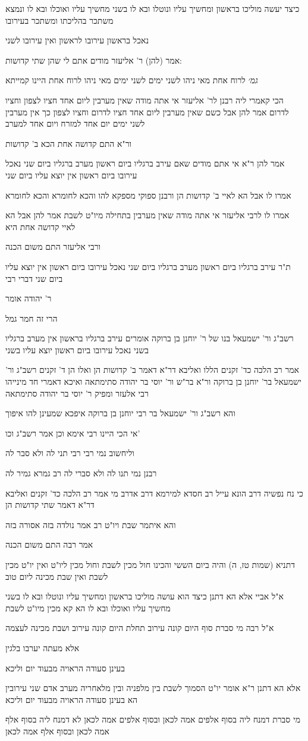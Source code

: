 \documentclass[12pt, openany]{book}
\newcommand{\sethebfont}{
\fontsize{10.5pt}{21.0pt} \selectfont
}
\newcommand{\textblock}[1]{
{\sethebfont #1\\}	
}
\begin{document}
\textblock{כיצד יעשה מוליכו בראשון ומחשיך עליו ונוטלו ובא לו בשני מחשיך עליו ואוכלו ובא לו ונמצא משתכר בהליכתו ומשתכר בעירובו}
\textblock{נאכל בראשון עירובו לראשון ואין עירובו לשני}
\textblock{אמר (להן) ר' אליעזר מודים אתם לי שהן שתי קדושות:}
\textblock{{\large\emph{גמ׳}} לרוח אחת מאי ניהו לשני ימים לשני ימים מאי ניהו לרוח אחת היינו קמייתא}
\textblock{הכי קאמרי ליה רבנן לר' אליעזר אי אתה מודה שאין מערבין ליום אחד חציו לצפון וחציו לדרום אמר להן אבל כשם שאין מערבין ליום אחד חציו לדרום וחציו לצפון כך אין מערבין לשני ימים יום אחד למזרח ויום אחד למערב}
\textblock{ור"א התם קדושה אחת הכא ב' קדושות}
\textblock{אמר להן ר"א אי אתם מודים שאם עירב ברגליו ביום ראשון מערב ברגליו ביום שני נאכל עירובו ביום ראשון אין יוצא עליו ביום שני}
\textblock{אמרו לו אבל הא לאיי ב' קדושות הן ורבנן ספוקי מספקא להו והכא לחומרא והכא לחומרא}
\textblock{אמרו לו לרבי אליעזר אי אתה מודה שאין מערבין בתחילה מיו"ט לשבת אמר להן אבל הא לאיי קדושה אחת היא}
\textblock{ורבי אליעזר התם משום הכנה}
\textblock{ת"ר עירב ברגליו ביום ראשון מערב ברגליו ביום שני נאכל עירובו ביום ראשון אין יוצא עליו ביום שני דברי רבי}
\textblock{ר' יהודה אומר}
\textblock{הרי זה חמר גמל}
\textblock{רשב"ג ור' ישמעאל בנו של ר' יוחנן בן ברוקה אומרים עירב ברגליו בראשון אין מערב ברגליו בשני נאכל עירובו ביום ראשון יוצא עליו בשני}
\textblock{אמר רב הלכה כד' זקנים הללו ואליבא דר"א דאמר ב' קדושות הן ואלו הן ד' זקנים רשב"ג ור' ישמעאל בר' יוחנן בן ברוקה ור"א בר"ש ור' יוסי בר יהודה סתימתאה ואיכא דאמרי חד מינייהו רבי אלעזר ומפיק ר' יוסי בר יהודה סתימתאה}
\textblock{והא רשב"ג ור' ישמעאל בר רבי יוחנן בן ברוקה איפכא שמעינן להו איפוך}
\textblock{אי הכי היינו רבי אימא וכן אמר רשב"ג וכו'}
\textblock{וליחשוב נמי רבי רבי תני לה ולא סבר לה}
\textblock{רבנן נמי תנו לה ולא סברי לה רב גמרא גמיר לה}
\textblock{כי נח נפשיה דרב הונא עייל רב חסדא למירמא דרב אדרב מי אמר רב הלכה כד' זקנים ואליבא דר"א דאמר שתי קדושות הן}
\textblock{והא איתמר שבת ויו"ט רב אמר נולדה בזה אסורה בזה}
\textblock{אמר רבה התם משום הכנה}
\textblock{דתניא (שמות טז, ה) והיה ביום הששי והכינו חול מכין לשבת וחול מכין ליו"ט ואין יו"ט מכין לשבת ואין שבת מכינה ליום טוב}
\textblock{א"ל אביי אלא הא דתנן כיצד הוא עושה מוליכו בראשון ומחשיך עליו ונוטלו ובא לו בשני מחשיך עליו ואוכלו ובא לו הא קא מכין מיו"ט לשבת}
\textblock{א"ל רבה מי סברת סוף היום קונה עירוב תחלת היום קונה עירוב ושבת מכינה לעצמה}
\textblock{אלא מעתה יערבו בלגין}
\textblock{בעינן סעודה הראויה מבעוד יום וליכא}
\textblock{אלא הא דתנן ר"א אומר יו"ט הסמוך לשבת בין מלפניה ובין מלאחריה מערב אדם שני עירובין הא בעינן סעודה הראויה מבעוד יום וליכא}
\textblock{מי סברת דמנח ליה בסוף אלפים אמה לכאן ובסוף אלפים אמה לכאן לא דמנח ליה בסוף אלף אמה לכאן ובסוף אלף אמה לכאן}
\end{document}
